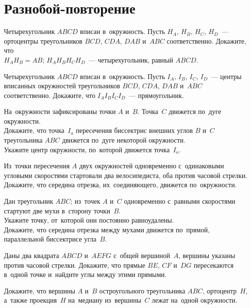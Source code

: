 
\section*{Разнобой-повторение}


\begin{problems}

\item
Четырехугольник $ABCD$ вписан в~окружность.
Пусть $H_A$, $H_B$, $H_C$, $H_D$~--- ортоцентры треугольников
$BCD$, $CDA$, $DAB$ и~$ABC$ соответственно.
Докажите, что
\\
\sp $H_A H_B = AB$;
\quad
\sp $H_A H_B H_C H_D$~--- четырехугольник, равный $ABCD$.

\item
Четырехугольник $ABCD$ вписан в~окружность.
Пусть $I_A$, $I_B$, $I_C$, $I_D$~---
центры вписанных окружностей треугольников $BCD$, $CDA$, $DAB$ и~$ABC$
соответственно.
Докажите, что $I_A I_B I_C I_D$~--- прямоугольник.

\item
На~окружности зафиксированы точки $A$ и~$B$.
Точка~$C$ движется по~дуге окружности.
\\
\sp
Докажите, что точка~$I_a$ пересечения биссектрис внешних углов $B$ и~$C$
треугольника $ABC$ движется по~дуге некоторой окружности.
\\
\sp
Укажите центр окружности, по~которой движется точка~$I_a$.

\item
Из~точки пересечения $A$ двух окружностей одновременно с~одинаковыми угловыми
скоростями стартовали два велосипедиста, оба против часовой стрелки.
Докажите, что середина отрезка, их~соединяющего, движется по~окружности.

\item
Дан треугольник $ABC$;
из~точек $A$ и~$C$ одновременно с~равными скоростями стартуют две мухи
в~сторону точки~$B$.
\\
\sp
Укажите точку, от~которой они постоянно равноудалены.
\\
\sp
Докажите, что середина отрезка между мухами движется по~прямой, параллельной
биссектрисе угла~$B$.

\item
Даны два квадрата $ABCD$ и~$AEFG$ с~общей вершиной~$A$, вершины указаны против
часовой стрелки.
Докажите, что прямые $BE$, $CF$ и~$DG$ пересекаются в~одной точке и~найдите
углы между этими прямыми.

\item
Докажите, что вершины $A$ и~$B$ остроугольного треугольника $ABC$,
ортоцентр~$H$, а~также проекция~$H$ на~медиану из~вершины~$C$ лежат на~одной
окружности.

\end{problems}

